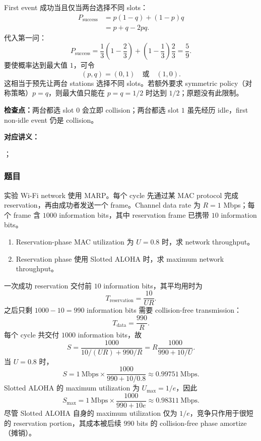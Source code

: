 \begin{checkedsolution}
First event 成功当且仅当两台选择不同 slots：
\[
\begin{aligned}
  P_{\mathrm{success}}
    &=p(1-q)+(1-p)q\\
    &=p+q-2pq.
\end{aligned}
\]
代入第一问：
\[
  P_{\mathrm{success}}
  =\frac13\left(1-\frac23\right)
   +\left(1-\frac13\right)\frac23
  =\boxed{\frac59}.
\]
要使概率达到最大值 $1$，可令
\[
  \boxed{(p,q)=(0,1)\quad\text{或}\quad(1,0)}.
\]
这相当于预先让两台 stations 选择不同 slots。若额外要求 symmetric policy（对称策略）$p=q$，则最大值只能在 $p=q=1/2$ 时达到 $1/2$；原题没有此限制。
\end{checkedsolution}

\textbf{检查点：}两台都选 slot $0$ 会立即 collision；两台都选 slot $1$ 虽先经历 idle，first non-idle event 仍是 collision。


\textbf{对应讲义：}\par
{}；\par
{}

\subsubsection*{题目}

实验 Wi-Fi network 使用 MARP。每个 cycle 先通过某 MAC protocol 完成 reservation，再由成功者发送一个 frame。Channel data rate 为 $R=1$ Mbps；每个 frame 含 $1000$ information bits，其中 reservation frame 已携带 $10$ information bits。
\begin{enumerate}[label=(\roman*)]
  \item Reservation-phase MAC utilization 为 $U=0.8$ 时，求 network throughput。
  \item Reservation phase 使用 Slotted ALOHA 时，求 maximum network throughput。
\end{enumerate}

\begin{checkedsolution}
一次成功 reservation 交付前 $10$ information bits，其平均用时为
\[
  T_{\mathrm{reservation}}=\frac{10}{UR}.
\]
之后只剩 $1000-10=990$ information bits 需要 collision-free transmission：
\[
  T_{\mathrm{data}}=\frac{990}{R}.
\]
每个 cycle 共交付 $1000$ information bits，故
\[
  S
  =\frac{1000}{10/(UR)+990/R}
  =R\frac{1000}{990+10/U}.
\]
当 $U=0.8$ 时，
\[
  S=1\ \mathrm{Mbps}\times\frac{1000}{990+10/0.8}
   \approx\boxed{0.99751\ \mathrm{Mbps}}.
\]
Slotted ALOHA 的 maximum utilization 为 $U_{\max}=1/e$，因此
\[
  S_{\max}
  =1\ \mathrm{Mbps}\times\frac{1000}{990+10e}
  \approx\boxed{0.98311\ \mathrm{Mbps}}.
\]
尽管 Slotted ALOHA 自身的 maximum utilization 仅为 $1/e$，竞争只作用于很短的 reservation portion，其成本被后续 $990$ bits 的 collision-free phase amortize（摊销）。
\end{checkedsolution}

